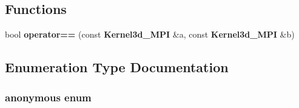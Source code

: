 \subsection*{Functions}
\begin{CompactItemize}
\item 
bool {\bf operator==} (const {\bf Kernel3d\_\-MPI} \&a, const {\bf Kernel3d\_\-MPI} \&b)
\end{CompactItemize}


\subsection{Enumeration Type Documentation}
\subsubsection{\setlength{\rightskip}{0pt plus 5cm}anonymous enum}\label{kernel3d__mpi_8hpp_dca29a1140aadadfd92b34a02fa516ef_dca29a1140aadadfd92b34a02fa516ef}


